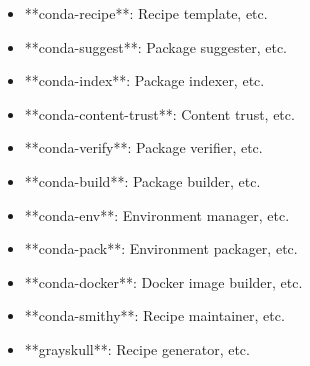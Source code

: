\documentclass[11pt,a4paper]{article}
\begin{document}
\begin{itemize}
\item **conda-recipe**: Recipe template, etc.
\end{itemize}

\begin{itemize}
\item **conda-suggest**: Package suggester, etc.
\end{itemize}

\begin{itemize}
\item **conda-index**: Package indexer, etc.
\end{itemize}

\begin{itemize}
\item **conda-content-trust**: Content trust, etc.
\end{itemize}

\begin{itemize}
\item **conda-verify**: Package verifier, etc.
\end{itemize}

\begin{itemize}
\item **conda-build**: Package builder, etc.
\end{itemize}

\begin{itemize}
\item **conda-env**: Environment manager, etc.
\end{itemize}

\begin{itemize}
\item **conda-pack**: Environment packager, etc.
\end{itemize}

\begin{itemize}
\item **conda-docker**: Docker image builder, etc.
\end{itemize}

\begin{itemize}
\item **conda-smithy**: Recipe maintainer, etc.
\end{itemize}

\begin{itemize}
\item **grayskull**: Recipe generator, etc.
\end{itemize}
\end{document}
